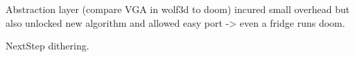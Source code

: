 Abstraction layer (compare VGA in wolf3d to doom) incured small overhead but also unlocked new algorithm and allowed easy port -> even a fridge runs doom.\\
\par
NextStep dithering.\\
\\ 

\par
{}\\




